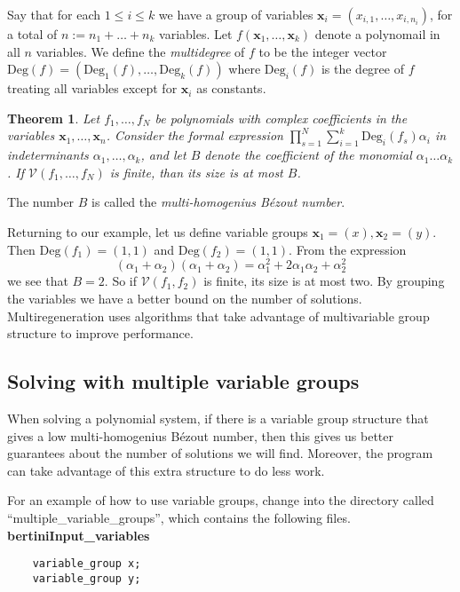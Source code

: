 \documentclass[12pt]{article}
\newtheorem{theorem}{Theorem}[section]
\theoremstyle{definition}
\newcommand{\Deg}{\text{Deg}}
\begin{document}
Say that for each $1 \leq i \leq k$ we have a group of variables 
$\mathbf{x}_i = (x_{i,1}, \ldots, x_{i,n_i})$, for a total of $n := n_1 
+ \ldots + n_k$ variables. Let $f(\mathbf{x}_1, \ldots, 
\mathbf{x}_k)$ denote a polynomail in all $n$ variables. We define the 
\emph{multidegree} of $f$ to be the integer vector $\Deg(f) = 
(\Deg_1(f), \ldots, \Deg_k(f))$ where $\Deg_i(f)$ is the degree of $f$ 
treating all variables except for $\mathbf{x}_i$ as constants.

\begin{theorem}
Let $f_1, \ldots, f_N$ be polynomials with complex coefficients in the 
   variables $\mathbf{x}_1, 
\ldots, \mathbf{x}_n$. Consider the formal expression $\prod_{s = 1}^N 
\sum_{i = 1}^{k} \Deg_i(f_s) \alpha_i$ in indeterminants $\alpha_1, 
\ldots, \alpha_k$, and let $B$ denote the coefficient of the monomial 
$\alpha_1\ldots \alpha_k$. If $\mathcal{V}(f_1, \ldots, f_N)$ is finite, 
than its size is at most $B$.
\end{theorem}

The number $B$ is called the \emph{multi-homogenius B\'{e}zout number}.

Returning to our example, let us define variable groups $\mathbf{x}_1 = 
(x), \mathbf{x}_2 = (y)$. Then $\Deg(f_1) = (1,1)$ and $\Deg(f_2) = 
(1,1)$. From the expression
\[
    (\alpha_1 + \alpha_2)(\alpha_1 + \alpha_2) = \alpha_1^2 + 
   2\alpha_1\alpha_2 + \alpha_2^2
\]
we see that $B = 2$. So if $\mathcal{V}(f_1, f_2)$ is finite, its size is 
at most two.
By grouping the variables we have a better bound on the number of solutions. 
Multiregeneration uses algorithms that take advantage of multivariable group structure to improve performance. 



\subsection{Solving with multiple variable groups}
When solving a polynomial system, if there is a variable group structure 
that gives a low multi-homogenius B\'{e}zout number, then this 
gives us better guarantees about the number of solutions we will find. 
Moreover, the program can take advantage of this extra structure to do 
less work.

For an example of how to use variable groups, change into the directory 
called ``multiple\_variable\_groups'', which contains the following 
files.\\

\noindent \textbf{bertiniInput\_variables}
\begin{leftbar}
\vspace{-10pt} 
\begin{verbatim}
    variable_group x; 
    variable_group y; 
\end{verbatim}\vspace{-10pt} 
\end{leftbar}
\end{document}
